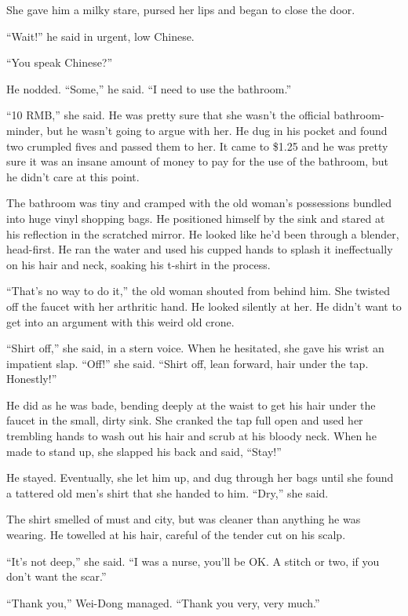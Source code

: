 She gave him a milky stare, pursed her lips and began to close the
door.

``Wait!'' he said in urgent, low Chinese.

``You speak Chinese?''

He nodded. ``Some,'' he said. ``I need to use the bathroom.''

``10 RMB,'' she said. He was pretty sure that she wasn't the official
bathroom-minder, but he wasn't going to argue with her. He dug in
his pocket and found two crumpled fives and passed them to her. It
came to \$1.25 and he was pretty sure it was an insane amount of
money to pay for the use of the bathroom, but he didn't care at
this point.

The bathroom was tiny and cramped with the old woman's possessions
bundled into huge vinyl shopping bags. He positioned himself by the
sink and stared at his reflection in the scratched mirror. He
looked like he'd been through a blender, head-first. He ran the
water and used his cupped hands to splash it ineffectually on his
hair and neck, soaking his t-shirt in the process.

``That's no way to do it,'' the old woman shouted from behind him.
She twisted off the faucet with her arthritic hand. He looked
silently at her. He didn't want to get into an argument with this
weird old crone.

``Shirt off,'' she said, in a stern voice. When he hesitated, she
gave his wrist an impatient slap. ``Off!'' she said. ``Shirt off, lean
forward, hair under the tap. Honestly!''

He did as he was bade, bending deeply at the waist to get his hair
under the faucet in the small, dirty sink. She cranked the tap full
open and used her trembling hands to wash out his hair and scrub at
his bloody neck. When he made to stand up, she slapped his back and
said, ``Stay!''

He stayed. Eventually, she let him up, and dug through her bags
until she found a tattered old men's shirt that she handed to him.
``Dry,'' she said.

The shirt smelled of must and city, but was cleaner than anything
he was wearing. He towelled at his hair, careful of the tender cut
on his scalp.

``It's not deep,'' she said. ``I was a nurse, you'll be OK. A stitch
or two, if you don't want the scar.''

``Thank you,'' Wei-Dong managed. ``Thank you very, very much.''

